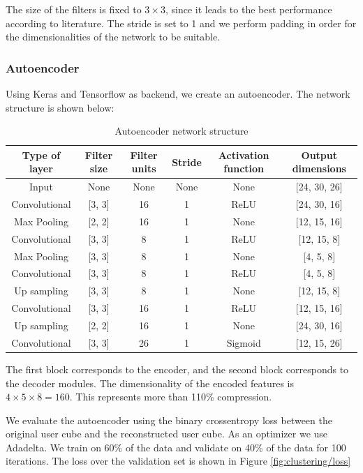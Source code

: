 \documentclass{article}
\begin{document}
The size of the filters is fixed to $3 \times 3$, since it leads to the best performance according to literature. The stride is set to 1 and we perform padding in order for the dimensionalities of the network to be suitable.


\subsubsection{Autoencoder}
Using Keras and Tensorflow as backend, we create an autoencoder. The network structure is shown below:

\begin{table}[H]
\centering
\begin{tabular}{||c|c|c|c|c|c||}
\hline
\textbf{Type of layer} & \textbf{Filter size} & \textbf{Filter units} & \textbf{Stride} & \textbf{Activation function} & \textbf{Output dimensions} \\
[0.5ex] 
\hline \hline
Input & None & None & None & None  & [24, 30, 26]\\
Convolutional & [3, 3] & 16 & 1 & ReLU  & [24, 30, 16]\\
Max Pooling & [2, 2] & 16 & 1 & None  & [12, 15, 16]\\
Convolutional & [3, 3] & 8 & 1 & ReLU  & [12, 15, 8]\\
Max Pooling & [3, 3] & 8 & 1 & None  & [4, 5, 8]\\
\hline
Convolutional & [3, 3] & 8 & 1 & ReLU  & [4, 5, 8]\\
Up sampling & [3, 3] & 8 & 1 & None  & [12, 15, 8]\\
Convolutional & [3, 3] & 16 & 1 & ReLU  & [12, 15, 16]\\
Up sampling & [2, 2] & 16 & 1 & None  & [24, 30, 16]\\
Convolutional & [3, 3] & 26 & 1 & Sigmoid  & [12, 15, 26]\\ [1ex]
\hline 
\end{tabular}
\caption{Autoencoder network structure}
\label{table:autoencoderStructure}
\end{table}

The first block corresponds to the encoder, and the second block corresponds to the decoder modules. The dimensionality of the encoded features is $4 \times 5 \times 8 = 160$. This represents more than 110\% compression. 

We evaluate the autoencoder using the binary crossentropy loss between the original user cube and the reconstructed user cube. As an optimizer we use Adadelta. We train on 60\% of the data and validate on 40\% of the data for 100 iterations. The loss over the validation set is shown in Figure \ref{fig:clustering/loss}
\end{document}
